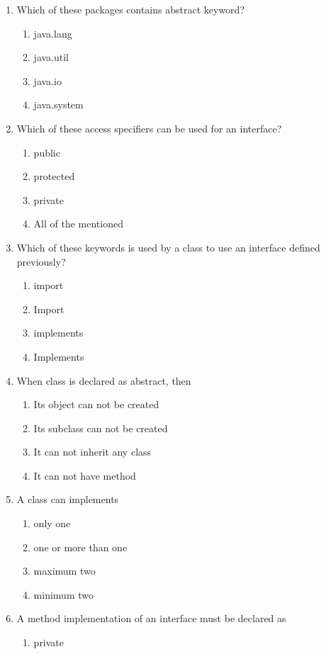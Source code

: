 \documentclass[11pt,a4paper]{article}
\begin{document}
\begin{enumerate}
    \item Which of these packages contains abstract keyword?
    \begin{enumerate}    
        \item java.lang
	\item java.util
	\item java.io
	\item java.system
    \end{enumerate}
    
    \item Which of these access specifiers can be used for an interface?
    \begin{enumerate}
	\item public
	\item protected
	\item private
	\item All of the mentioned
    \end{enumerate}
    \item Which of these keywords is used by a class to use an interface defined previously?
    \begin{enumerate}
	\item import
	\item Import
        \item implements
	\item Implements
    \end{enumerate}
    \item When class is declared as abstract, then
    \begin{enumerate}
	\item Its object can not be created
	\item Its subclass can not be created
	\item It can not inherit any class
	\item It can not have method
    \end{enumerate}
    \item A class can implements
    \begin{enumerate}
	\item only one
	\item one or more than one
	\item maximum two
	\item minimum two
    \end{enumerate}
    \item A method implementation of an interface must be declared as
    \begin{enumerate}	
	\item private

\end{enumerate}
\end{enumerate}
\end{document}
